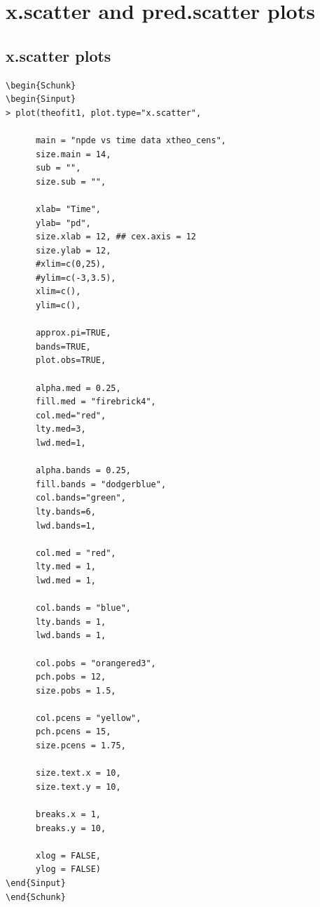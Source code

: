 \documentclass{report}
\begin{document}
\section{x.scatter and pred.scatter plots}

\subsection{x.scatter plots}

\begin{lstlisting}[linerange=\\begin\{Sinput\}-\\end\{Sinput\}, includerangemarker=false]
\begin{Schunk}
\begin{Sinput}
> plot(theofit1, plot.type="x.scatter",
      
      main = "npde vs time data xtheo_cens",
      size.main = 14,
      sub = "",
      size.sub = "",
      
      xlab= "Time",
      ylab= "pd",
      size.xlab = 12, ## cex.axis = 12
      size.ylab = 12,
      #xlim=c(0,25),
      #ylim=c(-3,3.5),
      xlim=c(),
      ylim=c(),
      
      approx.pi=TRUE,
      bands=TRUE,
      plot.obs=TRUE,
      
      alpha.med = 0.25,
      fill.med = "firebrick4",
      col.med="red",
      lty.med=3,
      lwd.med=1,
      
      alpha.bands = 0.25,
      fill.bands = "dodgerblue",
      col.bands="green",
      lty.bands=6,
      lwd.bands=1,
      
      col.med = "red",
      lty.med = 1,
      lwd.med = 1,
      
      col.bands = "blue",
      lty.bands = 1,
      lwd.bands = 1,
      
      col.pobs = "orangered3",
      pch.pobs = 12,
      size.pobs = 1.5,
      
      col.pcens = "yellow",
      pch.pcens = 15,
      size.pcens = 1.75,
      
      size.text.x = 10,
      size.text.y = 10,
      
      breaks.x = 1,
      breaks.y = 10,
      
      xlog = FALSE,
      ylog = FALSE)
\end{Sinput}
\end{Schunk}
\end{lstlisting}
\end{document}
